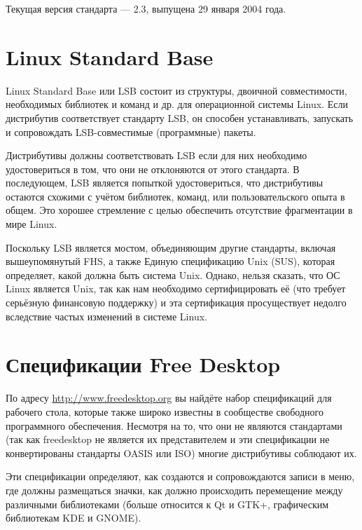 \documentclass[10pt]{book}
\begin{document}
Текущая версия стандарта — 2.3, выпущена 29 января 2004 года.

\section{Linux Standard Base}

Linux Standard Base или LSB состоит из структуры, двоичной совместимости, необходимых библиотек и команд и др. для операционной системы Linux. Если дистрибутив соответствует стандарту LSB, он способен устанавливать, запускать и сопровождать LSB-совместимые (программные) пакеты.

Дистрибутивы должны соответствовать LSB если для них необходимо удостовериться в том, что они не отклоняются от этого стандарта. В последующем, LSB является попыткой удостовериться, что дистрибутивы остаются схожими с учётом библиотек, команд, или пользовательского опыта в общем. Это хорошее стремление с целью обеспечить отсутствие фрагментации в мире Linux.

Поскольку LSB является мостом, объединяющим другие стандарты, включая вышеупомянутый FHS, а также Единую спецификацию Unix (SUS), которая определяет, какой должна быть система Unix. Однако, нельзя сказать, что ОС Linux является Unix, так как нам необходимо сертифицировать её (что требует серьёзную финансовую поддержку) и эта сертификация просуществует недолго вследствие частых изменений в системе Linux.

\section{Спецификации Free Desktop}

По адресу  \href{http://www.freedesktop.org}{http://www.freedesktop.org} вы найдёте набор спецификаций для рабочего стола, которые также широко известны в сообществе свободного программного обеспечения. Несмотря на то, что они не являются стандартами (так как freedesktop не является их представителем и эти спецификации не конвертированы стандарты OASIS или ISO) многие дистрибутивы соблюдают их.

Эти спецификации определяют, как создаются и сопровождаются записи в меню, где должны размещаться значки, как должно происходить перемещение между различными библиотеками (больше относится к Qt и GTK+, графическим библиотекам KDE и GNOME).
\end{document}
